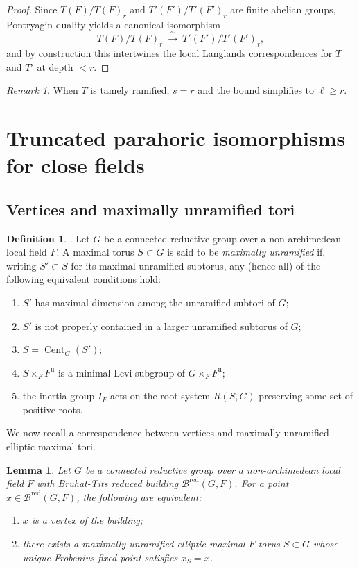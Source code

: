 \documentclass[american]{article}
\numberwithin{equation}{section}
\numberwithin{figure}{section}
\theoremstyle{plain}
\newtheorem{lemma}[theorem]{Lemma}
\theoremstyle{definition}
\newtheorem{definition}[theorem]{Definition}
\theoremstyle{remark}
\newtheorem{remark}[theorem]{Remark}
\begin{document}
\begin{proof}
\medskip\noindent
Since \(T(F)/T(F)_r\) and \(T'(F')/T'(F')_r\) are finite abelian groups, Pontryagin duality yields a canonical
isomorphism
\[
T(F)/T(F)_r\ \xrightarrow{\ \sim\ }\ T'(F')/T'(F')_r,
\]
and by construction this intertwines the local Langlands correspondences for \(T\) and \(T'\) at depth \(<r\).
\end{proof}



\begin{remark} 
When $T$ is tamely ramified, $s=r$ and the bound simplifies to $\ell\ge r$.
\end{remark} 

\section{Truncated parahoric isomorphisms for close fields}
\label{sec:wild-yu}
\subsection{Vertices and maximally unramified tori}\label{subsec:maxunramified}
\begin{definition}\cite[Fact 3.4.1 and Def. 3.4.2]{KalethaRegSC}.
Let \(G\) be a connected reductive group over a non-archimedean local field \(F\).
A maximal torus \(S\subset G\) is said to be \emph{maximally unramified} if, writing
\(S'\subset S\) for its maximal unramified subtorus, any (hence all) of the
following equivalent conditions hold:
\begin{enumerate}
  \item \(S'\) has maximal dimension among the unramified subtori of \(G\);
  \item \(S'\) is not properly contained in a larger unramified subtorus of \(G\);
  \item \(S=\operatorname{Cent}_G(S')\);
  \item \(S\times_F F^{\mathrm u}\) is a minimal Levi subgroup of \(G\times_F F^{\mathrm u}\);
  \item the inertia group \(I_F\) acts on the root system \(R(S,G)\) preserving
        some set of positive roots.
\end{enumerate}

\end{definition}

We now recall a correspondence between vertices and maximally unramified elliptic maximal tori. 
\begin{lemma}
\label{lem:vertex-torus-bijection}
Let $G$ be a connected reductive group over a non-archimedean local field $F$ with Bruhat-Tits reduced building $\mathcal{B}^{\mathrm{red}}(G,F)$. For a point $x\in\mathcal{B}^{\mathrm{red}}(G,F)$, the following are equivalent:
\begin{enumerate}
  \item $x$ is a vertex of the building;
  \item there exists a maximally unramified elliptic maximal $F$-torus $S\subset G$ whose unique Frobenius-fixed point satisfies $x_S = x$.
\end{enumerate}

\end{lemma}
\end{document}
